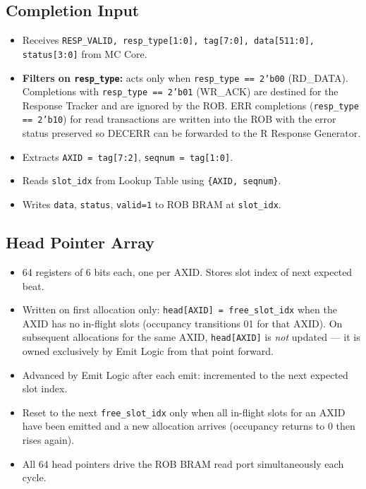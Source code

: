 \documentclass[11pt]{article}
\begin{document}
\subsection{Completion Input}
\begin{itemize}[noitemsep]
  \item Receives \texttt{RESP\_VALID, resp\_type[1:0], tag[7:0], data[511:0], status[3:0]}
        from MC Core.
  \item \textbf{Filters on \texttt{resp\_type}:} acts only when
        \texttt{resp\_type == 2'b00} (RD\_DATA). Completions with
        \texttt{resp\_type == 2'b01} (WR\_ACK) are destined for the Response Tracker
        and are ignored by the ROB. ERR completions (\texttt{resp\_type == 2'b10}) for
        read transactions are written into the ROB with the error status preserved so
        DECERR can be forwarded to the R Response Generator.
  \item Extracts \texttt{AXID = tag[7:2]}, \texttt{seqnum = tag[1:0]}.
  \item Reads \texttt{slot\_idx} from Lookup Table using \texttt{\{AXID, seqnum\}}.
  \item Writes \texttt{data}, \texttt{status}, \texttt{valid=1} to ROB BRAM at \texttt{slot\_idx}.
\end{itemize}

\subsection{Head Pointer Array}
\begin{itemize}[noitemsep]
  \item 64 registers of 6 bits each, one per AXID. Stores slot index of next expected beat.
  \item Written on first allocation only: \texttt{head[AXID] = free\_slot\_idx} when the
        AXID has no in-flight slots (occupancy transitions 0\textrightarrow{}1 for that AXID).
        On subsequent allocations for the same AXID, \texttt{head[AXID]} is \emph{not} updated
        — it is owned exclusively by Emit Logic from that point forward.
  \item Advanced by Emit Logic after each emit: incremented to the next expected slot index.
  \item Reset to the next \texttt{free\_slot\_idx} only when all in-flight slots for an AXID
        have been emitted and a new allocation arrives (occupancy returns to 0 then rises again).
  \item All 64 head pointers drive the ROB BRAM read port simultaneously each cycle.
\end{itemize}
\end{document}

